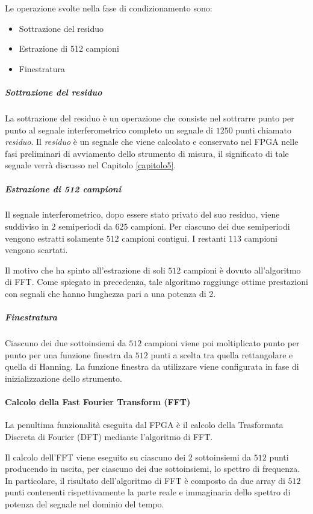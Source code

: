 Le operazione svolte nella fase di condizionamento sono:
\begin{itemize}
	\item Sottrazione del residuo
	\item Estrazione di 512 campioni
	\item Finestratura
\end{itemize}

\subparagraph{Sottrazione del residuo}
La sottrazione del residuo è un operazione che consiste nel sottrarre punto per punto al segnale interferometrico completo un segnale di $1250$ punti chiamato \textit{residuo}. Il \textit{residuo} è un segnale che viene calcolato e conservato nel FPGA nelle fasi preliminari di avviamento dello strumento di misura, il significato di tale segnale verrà discusso nel Capitolo \ref{capitolo5}.

\subparagraph{Estrazione di 512 campioni}
Il segnale interferometrico, dopo essere stato privato del suo residuo, viene suddiviso in $2$ semiperiodi da $625$ campioni. Per ciascuno dei due semiperiodi vengono estratti solamente $512$ campioni contigui. I restanti $113$ campioni vengono scartati. 

Il motivo che ha spinto all'estrazione di soli $512$ campioni è dovuto all'algoritmo di FFT. Come spiegato in precedenza, tale algoritmo raggiunge ottime prestazioni con segnali che hanno lunghezza pari a una potenza di 2.

\subparagraph{Finestratura}
Ciascuno dei due sottoinsiemi da $512$ campioni viene poi moltiplicato punto per punto per una funzione finestra da $512$ punti a scelta tra quella rettangolare e quella di Hanning. La funzione finestra da utilizzare viene configurata in fase di inizializzazione dello strumento.

\paragraph{Calcolo della Fast Fourier Transform (FFT)}
La penultima funzionalità eseguita dal FPGA è il calcolo della Trasformata Discreta di Fourier (DFT) mediante l'algoritmo di FFT.

Il calcolo dell'FFT viene eseguito su ciascuno dei 2 sottoinsiemi da $512$ punti producendo in uscita, per ciascuno dei due sottoinsiemi, lo spettro di frequenza. In particolare, il risultato dell'algoritmo di FFT è composto da due array di $512$ punti contenenti rispettivamente la parte reale e immaginaria dello spettro di potenza del segnale nel dominio del tempo.

